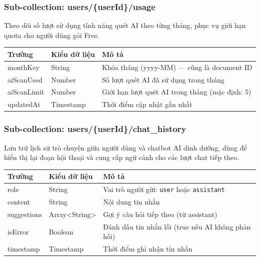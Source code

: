\subsubsection{Sub-collection: users/\{userId\}/usage}

Theo dõi số lượt sử dụng tính năng quét AI theo từng tháng, phục vụ giới hạn quota cho người dùng gói Free.

\begin{longtable}{|p{3.5cm}|p{3.5cm}|p{7.5cm}|}
    \hline
    \textbf{Trường} & \textbf{Kiểu dữ liệu} & \textbf{Mô tả} \\
    \hline
    \endhead
    \hline
    \endfoot
    monthKey & String & Khóa tháng (yyyy-MM) — cũng là document ID \\
    \hline
    aiScanUsed & Number & Số lượt quét AI đã sử dụng trong tháng \\
    \hline
    aiScanLimit & Number & Giới hạn lượt quét AI trong tháng (mặc định: 5) \\
    \hline
    updatedAt & Timestamp & Thời điểm cập nhật gần nhất \\
    \hline
\end{longtable}

\subsubsection{Sub-collection: users/\{userId\}/chat\_history}

Lưu trữ lịch sử trò chuyện giữa người dùng và chatbot AI dinh dưỡng, dùng để hiển thị lại đoạn hội thoại và cung cấp ngữ cảnh cho các lượt chat tiếp theo.

\begin{longtable}{|p{3.5cm}|p{3.5cm}|p{7.5cm}|}
    \hline
    \textbf{Trường} & \textbf{Kiểu dữ liệu} & \textbf{Mô tả} \\
    \hline
    \endhead
    \hline
    \endfoot
    role & String & Vai trò người gửi: \texttt{user} hoặc \texttt{assistant} \\
    \hline
    content & String & Nội dung tin nhắn \\
    \hline
    suggestions & Array<String> & Gợi ý câu hỏi tiếp theo (từ assistant) \\
    \hline
    isError & Boolean & Đánh dấu tin nhắn lỗi (true nếu AI không phản hồi) \\
    \hline
    timestamp & Timestamp & Thời điểm ghi nhận tin nhắn \\
    \hline
\end{longtable}

